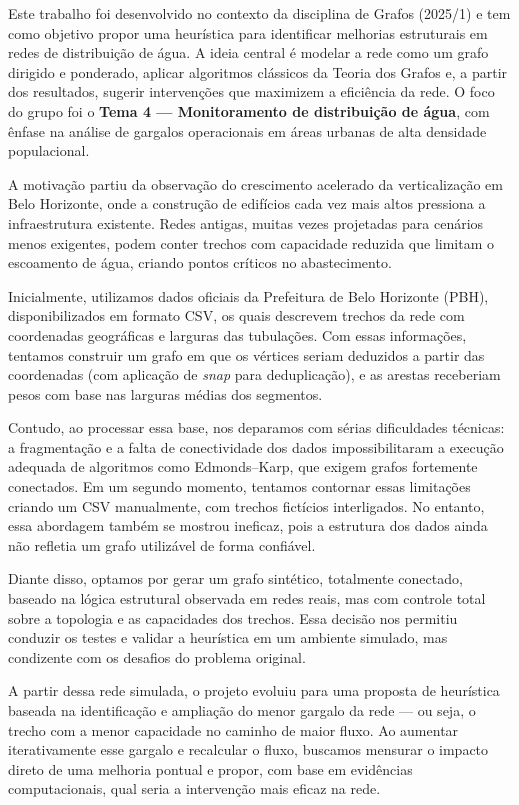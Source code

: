 \documentclass[12pt]{article}
\begin{document}
Este trabalho foi desenvolvido no contexto da disciplina de Grafos (2025/1) e tem como objetivo propor uma heurística para identificar melhorias estruturais em redes de distribuição de água. A ideia central é modelar a rede como um grafo dirigido e ponderado, aplicar algoritmos clássicos da Teoria dos Grafos e, a partir dos resultados, sugerir intervenções que maximizem a eficiência da rede. O foco do grupo foi o \textbf{Tema 4 — Monitoramento de distribuição de água}, com ênfase na análise de gargalos operacionais em áreas urbanas de alta densidade populacional.

A motivação partiu da observação do crescimento acelerado da verticalização em Belo Horizonte, onde a construção de edifícios cada vez mais altos pressiona a infraestrutura existente. Redes antigas, muitas vezes projetadas para cenários menos exigentes, podem conter trechos com capacidade reduzida que limitam o escoamento de água, criando pontos críticos no abastecimento.

Inicialmente, utilizamos dados oficiais da Prefeitura de Belo Horizonte (PBH), disponibilizados em formato CSV, os quais descrevem trechos da rede com coordenadas geográficas e larguras das tubulações. Com essas informações, tentamos construir um grafo em que os vértices seriam deduzidos a partir das coordenadas (com aplicação de \textit{snap} para deduplicação), e as arestas receberiam pesos com base nas larguras médias dos segmentos.

Contudo, ao processar essa base, nos deparamos com sérias dificuldades técnicas: a fragmentação e a falta de conectividade dos dados impossibilitaram a execução adequada de algoritmos como Edmonds–Karp, que exigem grafos fortemente conectados. Em um segundo momento, tentamos contornar essas limitações criando um CSV manualmente, com trechos fictícios interligados. No entanto, essa abordagem também se mostrou ineficaz, pois a estrutura dos dados ainda não refletia um grafo utilizável de forma confiável.

Diante disso, optamos por gerar um grafo sintético, totalmente conectado, baseado na lógica estrutural observada em redes reais, mas com controle total sobre a topologia e as capacidades dos trechos. Essa decisão nos permitiu conduzir os testes e validar a heurística em um ambiente simulado, mas condizente com os desafios do problema original.

A partir dessa rede simulada, o projeto evoluiu para uma proposta de heurística baseada na identificação e ampliação do menor gargalo da rede — ou seja, o trecho com a menor capacidade no caminho de maior fluxo. Ao aumentar iterativamente esse gargalo e recalcular o fluxo, buscamos mensurar o impacto direto de uma melhoria pontual e propor, com base em evidências computacionais, qual seria a intervenção mais eficaz na rede.
\end{document}

